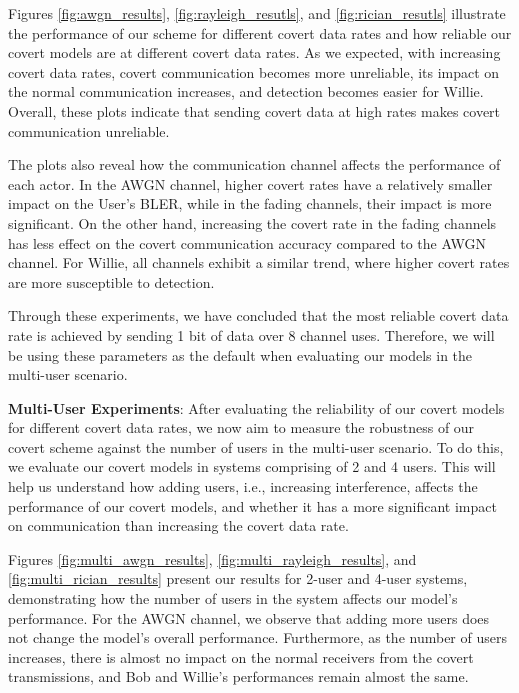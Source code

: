 Figures \ref{fig:awgn_results}, \ref{fig:rayleigh_resutls}, and \ref{fig:rician_resutls} illustrate the performance of our scheme for different covert data rates and how reliable our covert models are at different covert data rates. As we expected, with increasing covert data rates, covert communication becomes more unreliable, its impact on the normal communication increases, and detection becomes easier for Willie. Overall, these plots indicate that sending covert data at high rates makes covert communication unreliable.

The plots also reveal how the communication channel affects the performance of each actor. In the AWGN channel, higher covert rates have a relatively smaller impact on the User's BLER, while in the fading channels, their impact is more significant. On the other hand, increasing the covert rate in the fading channels has less effect on the covert communication accuracy compared to the AWGN channel. For Willie, all channels exhibit a similar trend, where higher covert rates are more susceptible to detection.

Through these experiments, we have concluded that the most reliable covert data rate is achieved by sending 1 bit of data over 8 channel uses. Therefore, we will be using these parameters as the default when evaluating our models in the multi-user scenario.

\textbf{Multi-User Experiments}: 
After evaluating the reliability of our covert models for different covert data rates, we now aim to measure the robustness of our covert scheme against the number of users in the multi-user scenario. To do this, we evaluate our covert models in systems comprising of 2 and 4 users. This will help us understand how adding users, i.e., increasing interference, affects  the performance of our covert models, and whether it has a more significant impact on communication than increasing the covert data rate.

Figures \ref{fig:multi_awgn_results}, \ref{fig:multi_rayleigh_results}, and \ref{fig:multi_rician_results} present our results for 2-user and 4-user systems, demonstrating how the number of users in the system affects our model's performance. For the AWGN channel, we observe that adding more users does not change the model's overall performance. Furthermore, as the number of users increases, there is almost no impact on the normal receivers from the covert transmissions, and Bob and Willie's performances remain almost the same.

